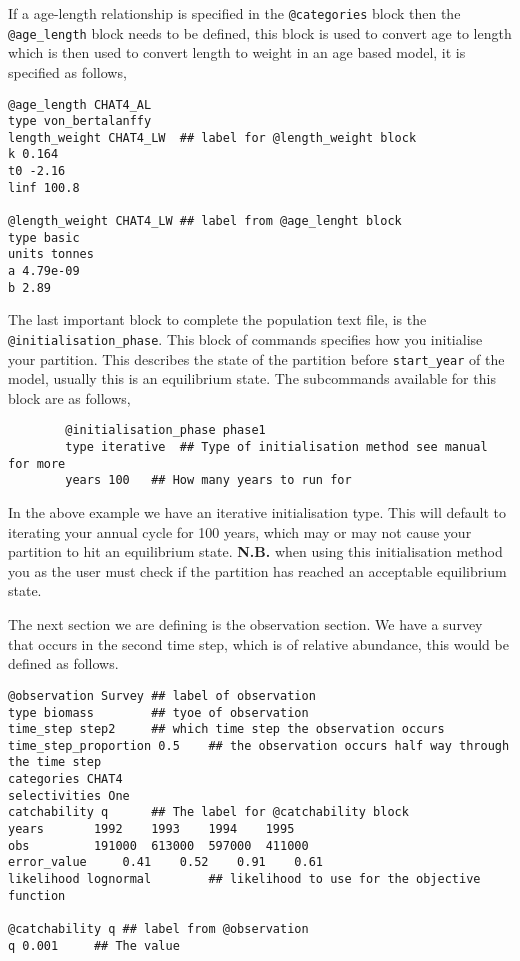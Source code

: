 \documentclass[12pt]{article}
\makeatletter
\newcommand{\command}[1] {\texttt{@#1}}
\makeatother
\begin{document}
If a age-length relationship is specified in the \command{categories} block then the \command{age\_length} block needs to be defined, this block is used to convert age to length which is then used to convert length to weight in an age based model, it is specified as follows,
{\small{\begin{verbatim}
@age_length CHAT4_AL
type von_bertalanffy
length_weight CHAT4_LW	## label for @length_weight block
k 0.164
t0 -2.16
linf 100.8

@length_weight CHAT4_LW	## label from @age_lenght block
type basic
units tonnes
a 4.79e-09 
b 2.89 
		\end{verbatim}}}

The last important block to complete the population text file, is the \command{initialisation\_phase}. This block of commands specifies how you initialise your partition. This describes the state of the partition before \texttt{start\_year} of the model, usually this is an equilibrium state. The subcommands available for this block are as follows,
{\small{\begin{verbatim}
		@initialisation_phase phase1
		type iterative	## Type of initialisation method see manual for more
		years 100	## How many years to run for
		\end{verbatim}}}

In the above example we have an iterative initialisation type. This will default to iterating your annual cycle for 100 years, which may or may not cause your partition to hit an equilibrium state. \textbf{N.B.} when using this initialisation method you as the user must check if the partition has reached an acceptable equilibrium state.

The next section we are defining is the observation section. We have a survey that occurs in the second time step, which is of relative abundance, this would be defined as follows.

{\small{\begin{verbatim}
@observation Survey	## label of observation
type biomass 		## tyoe of observation
time_step step2		## which time step the observation occurs
time_step_proportion 0.5	## the observation occurs half way through the time step
categories CHAT4
selectivities One
catchability q		## The label for @catchability block
years 		1992 	1993 	1994 	1995 	
obs 		191000	613000	597000	411000	
error_value 	0.41	0.52	0.91	0.61
likelihood lognormal		## likelihood to use for the objective function

@catchability q	## label from @observation
q 0.001		## The value
		\end{verbatim}}}
\end{document}
